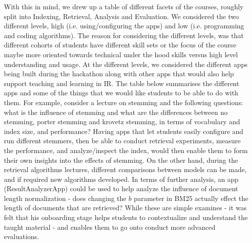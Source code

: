 With this in mind, we drew up a table of different facets of the courses, roughly split into Indexing, Retrieval, Analysis and Evaluation. We considered the two different levels, high (i.e. using/configuring the apps) and low (i.e. programming and coding algorithms). The reason for considering the different levels, was that different cohorts of students have different skill sets or the focus of the course maybe more oriented towards technical under the hood skills versus high level understanding and usage. At the different levels, we considered the different apps being built during the hackathon along with other apps that would also help support teaching and learning in IR. The table below summarises the different apps and some of the things that we would like students to be able to do with them. For example, consider a lecture on stemming and the following questions: what is the influence of stemming and what are the differences between no stemming, porter stemming and krovetz stemming, in terms of vocabulary and index size, and performance? Having apps that let students easily configure and run different stemmers, then be able to conduct retrieval experiments, measure the performance, and analyze/inspect the index, would then enable them to form their own insights into the effects of stemming. On the other hand, during the retrieval algorithms lectures, different comparisons between models can be made, and if required new algorithms developed. In terms of further analysis, an app (ResultAnalyzerApp) could be used to help analyze the influence of document length normalization - does changing the $b$ parameter in BM25 actually effect the length of documents that are retrieved?
While these are simple examines - it was felt that his onboarding stage helps students to contextualize and understand the taught material - and enables them to go onto conduct more advanced evaluations. 

